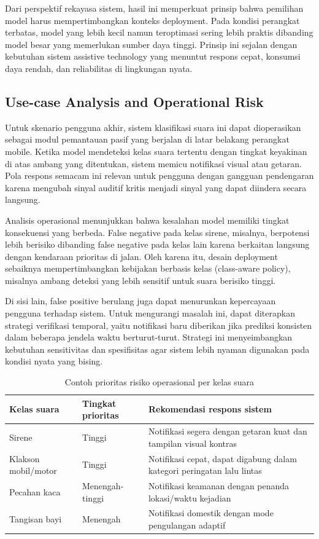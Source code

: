 \documentclass[10pt,a4paper]{jurnalvarian}
\let\LaTeXsubsection\subsection
\def\subsection{\setlength{\leftskip}{0.6cm}\LaTeXsubsection}
\begin{document}
Dari perspektif rekayasa sistem, hasil ini memperkuat prinsip bahwa pemilihan model harus mempertimbangkan konteks deployment. Pada kondisi perangkat terbatas, model yang lebih kecil namun teroptimasi sering lebih praktis dibanding model besar yang memerlukan sumber daya tinggi. Prinsip ini sejalan dengan kebutuhan sistem assistive technology yang menuntut respons cepat, konsumsi daya rendah, dan reliabilitas di lingkungan nyata.

\subsection{Use-case Analysis and Operational Risk}
Untuk skenario pengguna akhir, sistem klasifikasi suara ini dapat dioperasikan sebagai modul pemantauan pasif yang berjalan di latar belakang perangkat mobile. Ketika model mendeteksi kelas suara tertentu dengan tingkat keyakinan di atas ambang yang ditentukan, sistem memicu notifikasi visual atau getaran. Pola respons semacam ini relevan untuk pengguna dengan gangguan pendengaran karena mengubah sinyal auditif kritis menjadi sinyal yang dapat diindera secara langsung.

Analisis operasional menunjukkan bahwa kesalahan model memiliki tingkat konsekuensi yang berbeda. False negative pada kelas sirene, misalnya, berpotensi lebih berisiko dibanding false negative pada kelas lain karena berkaitan langsung dengan kendaraan prioritas di jalan. Oleh karena itu, desain deployment sebaiknya mempertimbangkan kebijakan berbasis kelas (class-aware policy), misalnya ambang deteksi yang lebih sensitif untuk suara berisiko tinggi.

Di sisi lain, false positive berulang juga dapat menurunkan kepercayaan pengguna terhadap sistem. Untuk mengurangi masalah ini, dapat diterapkan strategi verifikasi temporal, yaitu notifikasi baru diberikan jika prediksi konsisten dalam beberapa jendela waktu berturut-turut. Strategi ini menyeimbangkan kebutuhan sensitivitas dan spesifisitas agar sistem lebih nyaman digunakan pada kondisi nyata yang bising.

\begin{table}[H]
\centering
\fontsize{8pt}{10pt}\selectfont
\caption{Contoh prioritas risiko operasional per kelas suara}
\begin{tabular}{p{3.3cm}p{3.1cm}p{3.8cm}}
\hline
Kelas suara & Tingkat prioritas & Rekomendasi respons sistem \\
\hline
Sirene & Tinggi & Notifikasi segera dengan getaran kuat dan tampilan visual kontras \\
Klakson mobil/motor & Tinggi & Notifikasi cepat, dapat digabung dalam kategori peringatan lalu lintas \\
Pecahan kaca & Menengah-tinggi & Notifikasi keamanan dengan penanda lokasi/waktu kejadian \\
Tangisan bayi & Menengah & Notifikasi domestik dengan mode pengulangan adaptif \\
\hline
\end{tabular}
\end{table}
\end{document}
